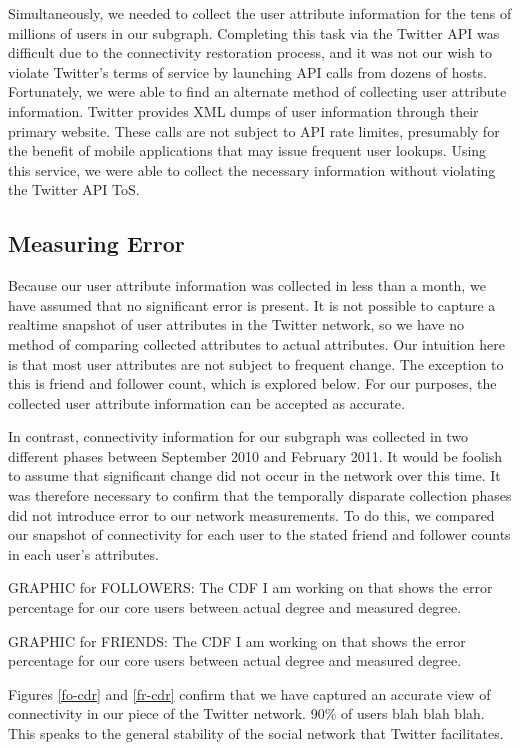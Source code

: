 Simultaneously, we needed to collect the user attribute information for the tens of millions of users in our subgraph.  Completing this task via the Twitter API was difficult due to the connectivity restoration process, and it was not our wish to violate Twitter's terms of service by launching API calls from dozens of hosts.  Fortunately, we were able to find an alternate method of collecting user attribute information.  Twitter provides XML dumps of user information through their primary website.  These calls are not subject to API rate limites, presumably for the benefit of mobile applications that may issue frequent user lookups.  Using this service, we were able to collect the necessary information without violating the Twitter API ToS.

\subsection{Measuring Error}

Because our user attribute information was collected in less than a month, we have assumed that no significant error is present.  It is not possible to capture a realtime snapshot of user attributes in the Twitter network, so we have no method of comparing collected attributes to actual attributes.  Our intuition here is that most user attributes are not subject to frequent change.  The exception to this is friend and follower count, which is explored below.  For our purposes, the collected user attribute information can be accepted as accurate.

In contrast, connectivity information for our subgraph was collected in two different phases between September 2010 and February 2011.  It would be foolish to assume that significant change did not occur in the network over this time.  It was therefore necessary to confirm that the temporally disparate collection phases did not introduce error to our network measurements.  To do this, we compared our snapshot of connectivity for each user to the stated friend and follower counts in each user's attributes.

GRAPHIC for FOLLOWERS: The CDF I am working on that shows the error percentage for our core users between actual degree and measured degree.

GRAPHIC for FRIENDS: The CDF I am working on that shows the error percentage for our core users between actual degree and measured degree.

Figures \ref{fo-cdr} and \ref{fr-cdr} confirm that we have captured an accurate view of connectivity in our piece of the Twitter network.  90\% of users blah blah blah.  This speaks to the general stability of the social network that Twitter facilitates.

